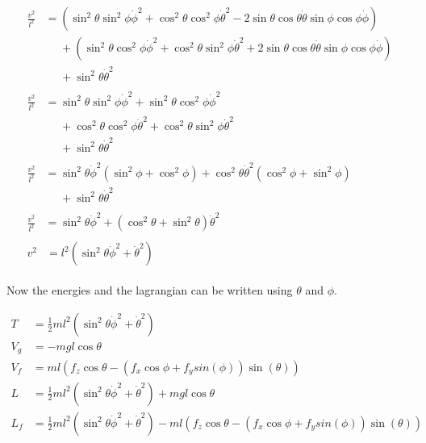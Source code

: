 \documentclass{scrartcl}
\begin{document}
\begin{align}
\begin{split}
\frac{v^2}{l^2}& = (\sin^2\theta \sin^2 \phi \dot{\phi}^2 + 
	\cos^2\theta \cos^2\phi \dot{\theta}^2 -
	2 \sin\theta\cos\theta\dot{\theta}\sin{\phi}\cos\phi\dot{\phi})\\
&\phantom{{}={}} + (\sin^2\theta \cos^2 \phi \dot\phi^2 + 
	\cos^2\theta \sin^2\phi \dot{\theta}^2 + 
	2 \sin{\theta} \cos\theta \dot{\theta} \sin{\phi}\cos\phi \dot{\phi} ) \\
&\phantom{{}={}} +	\sin^2\theta \dot{\theta}^2
\end{split}
\\
\begin{split}
\frac{v^2}{l^2}& = \sin^2\theta \sin^2 \phi \dot{\phi}^2 + \sin^2\theta \cos^2 \phi \dot\phi^2 \\
&\phantom{{}={}} + \cos^2\theta \cos^2\phi \dot{\theta}^2 +\cos^2\theta \sin^2\phi \dot{\theta}^2  \\
&\phantom{{}={}} +	\sin^2\theta \dot{\theta}^2
\end{split}
\\
\begin{split}
\frac{v^2}{l^2}& = \sin^2\theta \dot{\phi}^2 (\sin^2 \phi +\cos^2 \phi) + \cos^2\theta \dot{\theta}^2 (\cos^2\phi + \sin^2\phi) \\
&\phantom{{}={}} +	\sin^2\theta \dot{\theta}^2
\end{split}
\\
\begin{split}
\frac{v^2}{l^2}& = \sin^2\theta \dot{\phi}^2 + (\cos^2\theta + \sin^2\theta) \dot{\theta}^2
\end{split}
\\
\begin{split}
v^2& = l^2 (\sin^2\theta \dot{\phi}^2 + \dot{\theta}^2)
\end{split}
\end{align}

Now the energies and the lagrangian can be written using $\theta$ and $\phi$.

\begin{align}
T& = \frac{1}{2} m l^2 (\sin^2\theta \dot{\phi}^2 + \dot{\theta}^2)               \\
V_g& = - m g l \cos\theta								\\
V_f& = m l (f_z \cos\theta - (f_x \cos\phi + f_y sin(\phi)) \sin(\theta))								              \\
L& = \frac{1}{2} m  l^2 (\sin^2\theta \dot{\phi}^2 + \dot{\theta}^2) + m g l \cos\theta	    \\
L_f& = \frac{1}{2} m  l^2 (\sin^2\theta \dot{\phi}^2 + \dot{\theta}^2) - m l (f_z \cos\theta - (f_x \cos\phi + f_y sin(\phi)) \sin(\theta))
\end{align}
\end{document}
